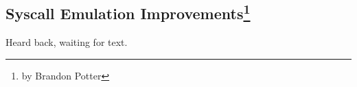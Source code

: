 \subsection[Syscall Emulation Improvements]{Syscall Emulation Improvements\footnote{by Brandon Potter}}

Heard back, waiting for text.
